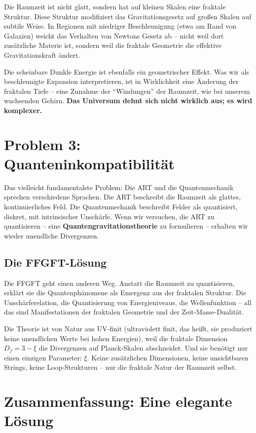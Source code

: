 Die Raumzeit ist nicht glatt, sondern hat auf kleinen Skalen eine fraktale Struktur. Diese Struktur modifiziert das Gravitationsgesetz auf großen Skalen auf subtile Weise. In Regionen mit niedriger Beschleunigung (etwa am Rand von Galaxien) weicht das Verhalten von Newtons Gesetz ab – nicht weil dort zusätzliche Materie ist, sondern weil die fraktale Geometrie die effektive Gravitationskraft ändert.

Die scheinbare Dunkle Energie ist ebenfalls ein geometrischer Effekt. Was wir als beschleunigte Expansion interpretieren, ist in Wirklichkeit eine Änderung der fraktalen Tiefe – eine Zunahme der \enquote{Windungen} der Raumzeit, wie bei unserem wachsenden Gehirn. \textbf{Das Universum dehnt sich nicht wirklich aus; es wird komplexer.}

\section{Problem 3: Quanteninkompatibilität}

Das vielleicht fundamentalste Problem: Die ART und die Quantenmechanik sprechen verschiedene Sprachen. Die ART beschreibt die Raumzeit als glattes, kontinuierliches Feld. Die Quantenmechanik beschreibt Felder als quantisiert, diskret, mit intrinsischer Unschärfe. Wenn wir versuchen, die ART zu quantisieren – eine \textbf{Quantengravitationstheorie} zu formulieren – erhalten wir wieder unendliche Divergenzen.

\subsection{Die FFGFT-Lösung}

Die FFGFT geht einen anderen Weg. Anstatt die Raumzeit zu quantisieren, erklärt sie die Quantenphänomene als Emergenz aus der fraktalen Struktur. Die Unschärferelation, die Quantisierung von Energieniveaus, die Wellenfunktion – all das sind Manifestationen der fraktalen Geometrie und der Zeit-Masse-Dualität.

Die Theorie ist von Natur aus UV-finit (ultraviolett finit, das heißt, sie produziert keine unendlichen Werte bei hohen Energien), weil die fraktale Dimension $D_f = 3 - \xi$ die Divergenzen auf Planck-Skalen abschneidet. Und sie benötigt nur einen einzigen Parameter: $\xi$. Keine zusätzlichen Dimensionen, keine unsichtbaren Strings, keine Loop-Strukturen – nur die fraktale Natur der Raumzeit selbst.

\section{Zusammenfassung: Eine elegante Lösung}

